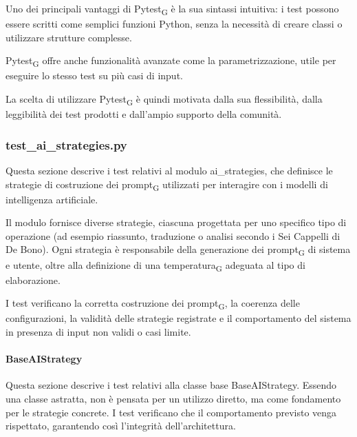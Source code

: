 \documentclass[11pt,a4paper]{article}
\newcommand{\gls}[1]{#1\textsubscript{G}}
\begin{document}
Uno dei principali vantaggi di \gls{Pytest} è la sua sintassi intuitiva: i test possono essere scritti come semplici funzioni Python, senza la necessità di creare classi o utilizzare strutture complesse.

\gls{Pytest} offre anche funzionalità avanzate come la parametrizzazione, utile per eseguire lo stesso test su più casi di input.

La scelta di utilizzare \gls{Pytest} è quindi motivata dalla sua flessibilità, dalla leggibilità dei test prodotti e dall’ampio supporto della comunità.


\subsubsection{test\_ai\_strategies.py}
Questa sezione descrive i test relativi al modulo ai\_strategies, che definisce le strategie di costruzione dei \gls{prompt} utilizzati per interagire con i modelli di intelligenza artificiale.

Il modulo fornisce diverse strategie, ciascuna progettata per uno specifico tipo di operazione (ad esempio riassunto, traduzione o analisi secondo i Sei Cappelli di De Bono). Ogni strategia è responsabile della generazione dei \gls{prompt} di sistema e utente, oltre alla definizione di una \gls{temperatura} adeguata al tipo di elaborazione.

I test verificano la corretta costruzione dei \gls{prompt}, la coerenza delle configurazioni, la validità delle strategie registrate e il comportamento del sistema in presenza di input non validi o casi limite.

\paragraph{BaseAIStrategy}
Questa sezione descrive i test relativi alla classe base BaseAIStrategy. Essendo una classe astratta, non è pensata per un utilizzo diretto, ma come fondamento per le strategie concrete. I test verificano che il comportamento previsto venga rispettato, garantendo così l’integrità dell’architettura.
\end{document}
